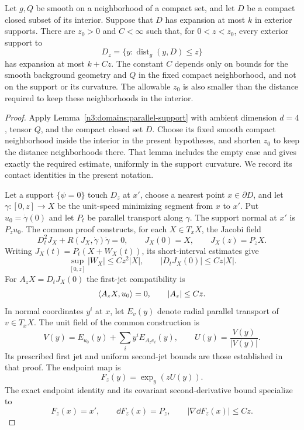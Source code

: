 \begin{lemma}\label{four:geo:support-transport}
Let $g,Q$ be smooth on a neighborhood of a compact set, and let $D$ be a
compact closed subset of its interior.  Suppose that $D$ has expansion at
most $k$ in exterior supports.  There are $z_0>0$ and $C<\infty$ such that,
for $0<z<z_0$, every exterior support to
\[
 D_z=\{y:\operatorname{dist}_g(y,D)\le z\}
\]
has expansion at most $k+Cz$.  The constant $C$ depends only on bounds for
the smooth background geometry and $Q$ in the fixed compact neighborhood,
and not on the support or its curvature.  The allowable $z_0$ is also
smaller than the distance required to keep these neighborhoods in the
interior.
\end{lemma}

\begin{proof}
Apply Lemma~\ref{n3:domains:parallel-support} with ambient dimension
$d=4$, tensor $Q$, and the compact closed set $D$.  Choose its fixed
smooth compact neighborhood inside the interior in the present
hypotheses, and shorten $z_0$ to keep the distance neighborhoods there.
That lemma includes the empty case and gives exactly the required
estimate, uniformly in the support curvature.  We record its contact
identities in the present notation.

Let a support $\{\psi=0\}$ touch $D_z$ at $x'$, choose a nearest point
$x\in\partial D$, and let $\gamma:[0,z]\to X$ be the unit-speed
minimizing segment from $x$ to $x'$.  Put $u_0=\dot\gamma(0)$ and let
$P_t$ be parallel transport along $\gamma$.  The support normal at $x'$
is $P_zu_0$.  The common proof constructs, for each $X\in T_xX$, the
Jacobi field
\begin{equation}\label{four:geo:jacobi-transport}
 D_t^2J_X+R(J_X,\dot\gamma)\dot\gamma=0,
 \qquad J_X(0)=X,\qquad J_X(z)=P_zX.
\end{equation}
Writing $J_X(t)=P_t(X+W_X(t))$, its short-interval estimates give
\begin{equation}\label{four:geo:jacobi-jet-bounds}
 \sup_{[0,z]}|W_X|\le Cz^2|X|,
 \qquad |D_tJ_X(0)|\le Cz|X|.
\end{equation}
For $A_zX=D_tJ_X(0)$ the first-jet compatibility is
\[
 \langle A_zX,u_0\rangle=0,\qquad |A_z|\le Cz.
\]
In normal coordinates $y^i$ at $x$, let $E_v(y)$ denote radial parallel
transport of $v\in T_xX$.  The unit field of the common construction is
\[
 V(y)=E_{u_0}(y)+\sum_i y^i E_{A_ze_i}(y),\qquad
 U(y)=\frac{V(y)}{|V(y)|}.
\]
Its prescribed first jet and uniform second-jet bounds are those
established in that proof.  The endpoint map is
\[
 F_z(y)=\exp_y(zU(y)).
\]
The exact endpoint identity and its covariant second-derivative bound
specialize to
\begin{equation}\label{four:geo:exact-isometry}
 F_z(x)=x',\qquad \dd F_z(x)=P_z,
 \qquad |\nabla\dd F_z(x)|\le Cz.
\end{equation}


\end{proof}
